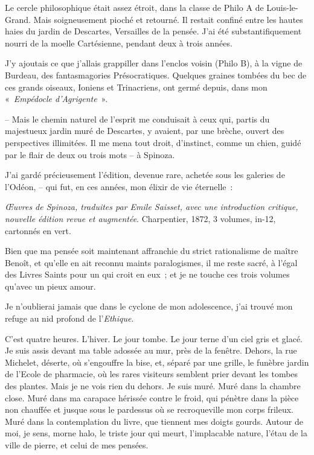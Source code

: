 Le cercle philosophique était assez étroit, dans la classe de Philo A de
Louis-le-Grand. Mais soigneusement pioché et retourné. Il restait
confiné entre les hautes haies du jardin de Descartes, Versailles de la
pensée. J'ai été substantifiquement nourri de la moelle Cartésienne,
pendant deux à trois années.

J'y ajoutais ce que j'allais grappiller dans l'enclos voisin (Philo B),
à la vigne de Burdeau, des fantasmagories Présocratiques. Quelques
graines tombées du bec de ces grands oiseaux, Ioniens et Trinacriens,
ont germé depuis, dans mon «~\emph{Empédocle d'Agrigente}~».

-- Mais le chemin naturel de l'esprit me conduisait à ceux qui, partis
du majestueux jardin muré de Descartes, y avaient, par une brèche,
ouvert des perspectives illimitées. Il me mena tout droit, d'instinct,
comme un chien, guidé par le flair de deux ou trois mots -- à Spinoza.

J'ai gardé précieusement l'édition, devenue rare, achetée sous les
galeries de l'Odéon, -- qui fut, en ces années, mon élixir de vie
éternelle~:

\emph{\OE uvres de Spinoza, traduites par Emile Saisset, avec une
introduction critique, nouvelle édition revue et augmentée}.
Charpentier, 1872, 3 volumes, in-12, cartonnés en vert.

Bien que ma pensée soit maintenant affranchie du strict rationalisme de
maître Benoît, et qu'elle en ait reconnu maints paralogismes, il me
reste sacré, à l'égal des Livres Saints pour un qui croit en eux~; et je
ne touche ces trois volumes qu'avec un pieux amour.

Je n'oublierai jamais que dans le cyclone de mon adolescence, j'ai
trouvé mon refuge au nid profond de l'\emph{Ethique}.

C'est quatre heures. L'hiver. Le jour tombe. Le jour terne d'un ciel
gris et glacé. Je suis assis devant ma table adossée au mur, près de la
fenêtre. Dehors, la rue Michelet, déserte, où s'engouffre la bise, et,
séparé par une grille, le funèbre jardin de l'Ecole de pharmacie, où les
rares visiteurs semblent prier devant les tombes des plantes.
Mais je ne vois rien du dehors. Je suis muré. Muré
dans la chambre close. Muré dans ma carapace hérissée contre le froid,
qui pénètre dans la pièce non chauffée et jusque sous le pardessus où se
recroqueville mon corps frileux. Muré dans la contemplation du livre,
que tiennent mes doigts gourds. Autour de moi, je sens, morne halo, le
triste jour qui meurt, l'implacable nature, l'étau de la ville de
pierre, et celui de mes pensées.

